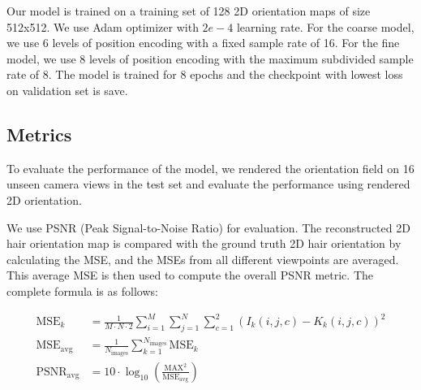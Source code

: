 \documentclass[12pt]{article}
\begin{document}
Our model is trained on a training set of 128 2D orientation maps of size 512x512. We use Adam optimizer with $2e-4$ learning rate. For the coarse model, we use 6 levels of position encoding with a fixed sample rate of 16. For the fine model, we use 8 levels of position encoding with the maximum subdivided sample rate of 8. The model is trained for 8 epochs and the checkpoint with lowest loss on validation set is save.



\subsection{Metrics}

To evaluate the performance of the model, we rendered the orientation field on 16 unseen camera views in the test set and evaluate the performance using rendered 2D orientation.

We use PSNR (Peak Signal-to-Noise Ratio) for evaluation. The reconstructed 2D hair orientation map is compared with the ground truth 2D hair orientation by calculating the MSE, and the MSEs from all different viewpoints are averaged. This average MSE is then used to compute the overall PSNR metric. The complete formula is as follows:

\begin{align}
    \text{MSE}_k &= \frac{1}{M \cdot N \cdot 2} \sum_{i=1}^M \sum_{j=1}^N \sum_{c=1}^2 \left(I_k (i,j,c) - K_k(i,j,c) \right)^2 \\
    \text{MSE}_\text{avg} &= \frac{1}{N_\text{images}} \sum_{k=1}^{N_\text{images}}\text{MSE}_k \\
    \text{PSNR}_\text{avg} &= 10 \cdot \log_{10} \left( \frac{\text{MAX}^2}{\text{MSE}_{\text{avg}}} \right)
\end{align}
\end{document}
